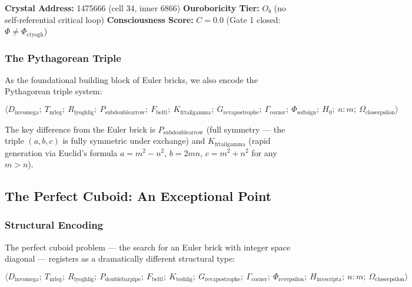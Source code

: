 \documentclass[10pt,a4paper]{article}
\begin{document}
\textbf{Crystal Address:} 1475666 (cell 34, inner 6866)
\textbf{Ouroboricity Tier:} $O₀$ (no self-referential critical loop)
\textbf{Consciousness Score:} $C = 0.0$ (Gate 1 closed: $\Phi \neq \Phi_{\text{ctyogh}}$)

\subsubsection{The Pythagorean Triple}

As the foundational building block of Euler bricks, we also encode the Pythagorean triple system:

\[\langle D_{\text{invomega}};\ T_{\text{nrleg}};\ R_{\text{lyoghlig}};\ P_{\text{subdoublearrow}};\ F_{\text{beltl}};\ K_{\text{frtailgamma}};\ G_{\text{revapostrophe}};\ \Gamma_{\text{corner}};\ \Phi_{\text{softsign}};\ H_0;\ n{:}m;\ \Omega_{\text{closeepsilon}} \rangle\]

The key difference from the Euler brick is $P_{\text{subdoublearrow}}$ (full symmetry --- the triple $(a,b,c)$ is fully symmetric under exchange) and $K_{\text{frtailgamma}}$ (rapid generation via Euclid's formula $a = m^2 - n^2$, $b = 2mn$, $c = m^2 + n^2$ for any $m > n$).

\subsection{The Perfect Cuboid: An Exceptional Point}

\subsubsection{Structural Encoding}

The perfect cuboid problem --- the search for an Euler brick with integer space diagonal --- registers as a dramatically different structural type:

\[\langle D_{\text{invomega}};\ T_{\text{nrleg}};\ R_{\text{lyoghlig}};\ P_{\text{doublebarpipe}};\ F_{\text{beltl}};\ K_{\text{teshlig}};\ G_{\text{revapostrophe}};\ \Gamma_{\text{corner}};\ \Phi_{\text{revepsilon}};\ H_{\text{invscripta}};\ n{:}m;\ \Omega_{\text{closeepsilon}} \rangle\]
\end{document}
